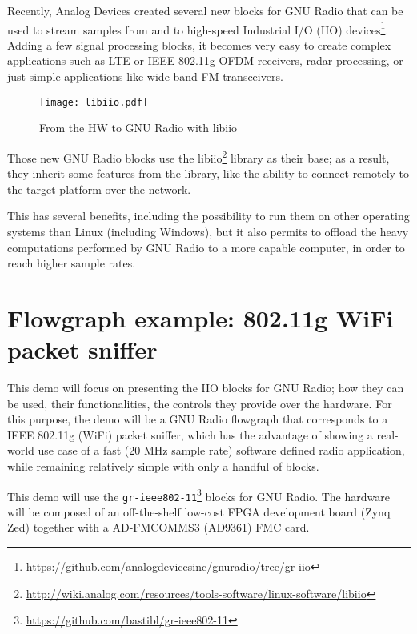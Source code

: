\documentclass{acm_proc_article-sp}
\begin{document}
Recently, Analog Devices created several new blocks for GNU Radio that can be
used to stream samples from and to high-speed Industrial I/O (IIO)
devices\footnote{\url{https://github.com/analogdevicesinc/gnuradio/tree/gr-iio}}.
Adding a few signal processing
blocks, it becomes very easy to create complex applications such as
LTE or IEEE 802.11g OFDM receivers, radar processing, or just simple
applications like wide-band FM transceivers.

\begin{figure}[htbp]
\centering
\texttt{[image: libiio.pdf]}
\caption{From the HW to GNU Radio with libiio}
\end{figure}

Those new GNU Radio blocks use the
libiio\footnote{\url{http://wiki.analog.com/resources/tools-software/linux-software/libiio}}
library as their base; as a result,
they inherit some features from the library, like the ability to connect
remotely to the target platform over the network.

This has several benefits, including the possibility to run them on other
operating systems than Linux (including Windows), but it also permits to
offload the heavy computations performed by GNU Radio to a more capable computer,
in order to reach higher sample rates.

\section{Flowgraph example: 802.11g WiFi packet sniffer}

This demo will focus on presenting the IIO blocks for GNU Radio; how they can be
used, their functionalities, the controls they provide over the hardware.
For this purpose, the demo will be a GNU Radio flowgraph that corresponds to a
IEEE 802.11g (WiFi) packet sniffer, which has the advantage of showing a
real-world use case of a fast (20 MHz sample rate) software defined radio
application, while remaining relatively simple with only a handful of blocks.

This demo will use the
\texttt{gr-ieee802-11}\footnote{\url{https://github.com/bastibl/gr-ieee802-11}}
blocks for GNU Radio. The hardware will be composed of an off-the-shelf low-cost
FPGA development board (Zynq Zed) together with a AD-FMCOMMS3 (AD9361) FMC card.

\balancecolumns
\end{document}

